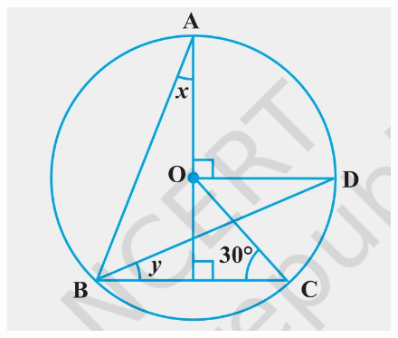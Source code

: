 \begin{enumerate}[label=\thesection.\arabic*,ref=\thesection.\theenumi]
		\begin{figure}[h!]                      \includegraphics[width=\columnwidth]{exemplar/9.10.4/figs/image4.jpg}                              \caption{}                                       \label{fig:exemplar/9.10.4/4}                    \end{figure}
\end{enumerate}
